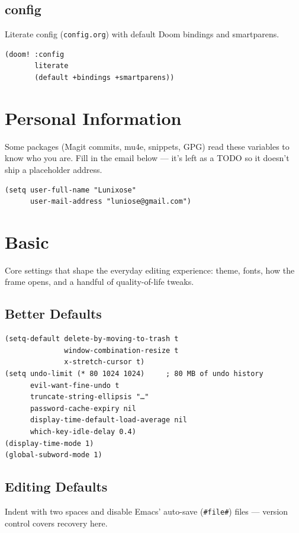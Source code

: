\documentclass[11pt]{article}
\begin{document}
\subsection{config}
\label{sec:orgb84e20f}
Literate config (\texttt{config.org}) with default Doom bindings and
smartparens.

\begin{verbatim}
(doom! :config
       literate
       (default +bindings +smartparens))
\end{verbatim}
\section{Personal Information}
\label{sec:org6e59325}
Some packages (Magit commits, mu4e, snippets, GPG) read these
variables to know who you are. Fill in the email below — it's left as
a TODO so it doesn't ship a placeholder address.

\begin{verbatim}
(setq user-full-name "Lunixose"
      user-mail-address "luniose@gmail.com")
\end{verbatim}
\section{Basic}
\label{sec:orga32d1ea}
Core settings that shape the everyday editing experience: theme,
fonts, how the frame opens, and a handful of quality-of-life tweaks.
\subsection{Better Defaults}
\label{sec:org05f4414}

\begin{verbatim}
(setq-default delete-by-moving-to-trash t
              window-combination-resize t
              x-stretch-cursor t)
(setq undo-limit (* 80 1024 1024)     ; 80 MB of undo history
      evil-want-fine-undo t
      truncate-string-ellipsis "…"
      password-cache-expiry nil
      display-time-default-load-average nil
      which-key-idle-delay 0.4)
(display-time-mode 1)
(global-subword-mode 1)
\end{verbatim}
\subsection{Editing Defaults}
\label{sec:org952c2ab}
Indent with two spaces and disable Emacs' auto-save (\texttt{\#file\#}) files —
version control covers recovery here.
\end{document}
